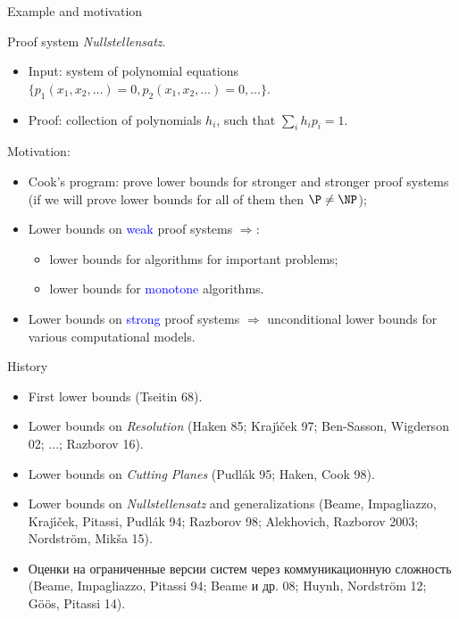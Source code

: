 \begin{frame}{Example and motivation}

    Proof system \textit{Nullstellensatz}.
    \begin{itemize}
        \item Input: system of polynomial equations $\{p_1(x_1, x_2, \dots) = 0, p_2(x_1, x_2, \dots) =
            0, \dots\}$.
            \pause
        \item Proof: collection of polynomials $h_i$, such that $\sum\limits_{i} h_i p_i = 1$.
    \end{itemize}

    Motivation:
    \begin{itemize}
        \item Cook's program: prove lower bounds for stronger and stronger proof systems (if we will
            prove lower bounds for all of them then $\P \neq \NP$);
        \pause
        \item Lower bounds on \textcolor{blue}{weak} proof systems
            $\Rightarrow$:
            \begin{itemize}
                \item lower bounds for algorithms for important problems;
                \item lower bounds for \textcolor{blue}{monotone} algorithms.
            \end{itemize}
        \pause
        \item Lower bounds on \textcolor{blue}{strong} proof systems $\Rightarrow$ unconditional lower
            bounds for various computational models.
    \end{itemize}

\end{frame}


\begin{frame}{History}

    \begin{itemize}
        \item First lower bounds (Tseitin 68).
        \pause
        \item Lower bounds on \textit{Resolution} (Haken 85; Kraj{\'{\i}}{\v{c}}ek 97; Ben-Sasson, Wigderson 02; ...;
            Razborov 16).
        \pause
        \item Lower bounds on \textit{Cutting Planes} (Pudl{\'{a}}k 95; Haken, Cook 98).
        \pause
        \item Lower bounds on \textit{Nullstellensatz} and generalizations (Beame, Impagliazzo,
            Kraj{\'{\i}}{\v{c}}ek, Pitassi, Pudl{\'{a}}k 94; Razborov 98; Alekhovich, Razborov 2003;
            Nordstr{\"{o}}m, Mik{\v{s}}a 15).
        \pause
        \item Оценки на ограниченные версии систем через коммуникационную сложность (Beame, Impagliazzo,
            Pitassi 94; Beame и др. 08; Huynh, Nordstr{\"{o}}m 12; G{\"{o}}{\"{o}}s, Pitassi 14).
    \end{itemize}

\end{frame}

